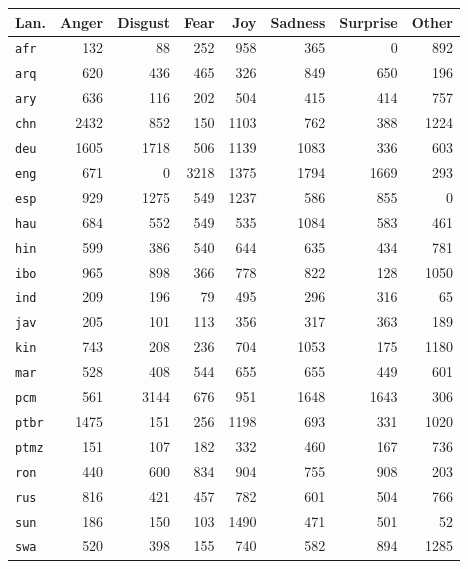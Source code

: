 \begin{table}[t]
  \small
  \centering
  \setlength{\tabcolsep}{4pt}
  \renewcommand{\arraystretch}{1.1}
  \begin{tabular}{@{}lrrrrrrr@{}}
    \toprule
    \textbf{Lan.} & \textbf{Anger} & \textbf{Disgust} & \textbf{Fear} & \textbf{Joy} & \textbf{Sadness} & \textbf{Surprise} & \textbf{Other} \\ 
    \midrule
    \texttt{afr} & 132 & 88 & 252 & 958 & 365 & 0 & 892 \\
    \texttt{arq} & 620 & 436 & 465 & 326 & 849 & 650 & 196 \\
    \texttt{ary} & 636 & 116 & 202 & 504 & 415 & 414 & 757 \\
    \texttt{chn} & 2432 & 852 & 150 & 1103 & 762 & 388 & 1224 \\
    \texttt{deu} & 1605 & 1718 & 506 & 1139 & 1083 & 336 & 603 \\
    \texttt{eng} & 671 & 0 & 3218 & 1375 & 1794 & 1669 & 293 \\
    \texttt{esp} & 929 & 1275 & 549 & 1237 & 586 & 855 & 0 \\
    \texttt{hau} & 684 & 552 & 549 & 535 & 1084 & 583 & 461 \\
    \texttt{hin} & 599 & 386 & 540 & 644 & 635 & 434 & 781 \\
    \texttt{ibo} & 965 & 898 & 366 & 778 & 822 & 128 & 1050 \\
    \texttt{ind} & 209 & 196 & 79 & 495 & 296 & 316 & 65 \\
    \texttt{jav} & 205 & 101 & 113 & 356 & 317 & 363 & 189 \\
    \texttt{kin} & 743 & 208 & 236 & 704 & 1053 & 175 & 1180 \\
    \texttt{mar} & 528 & 408 & 544 & 655 & 655 & 449 & 601 \\
    \texttt{pcm} & 561 & 3144 & 676 & 951 & 1648 & 1643 & 306 \\
    \texttt{ptbr} & 1475 & 151 & 256 & 1198 & 693 & 331 & 1020 \\
    \texttt{ptmz} & 151 & 107 & 182 & 332 & 460 & 167 & 736 \\
    \texttt{ron} & 440 & 600 & 834 & 904 & 755 & 908  & 203 \\
    \texttt{rus} & 816 & 421 & 457 & 782 & 601 & 504 & 766 \\
    \texttt{sun} & 186 & 150 & 103 & 1490 & 471 & 501 & 52 \\
    \texttt{swa} & 520 & 398 & 155 & 740 & 582 & 894 & 1285 \\

\end{tabular}
\end{table}
